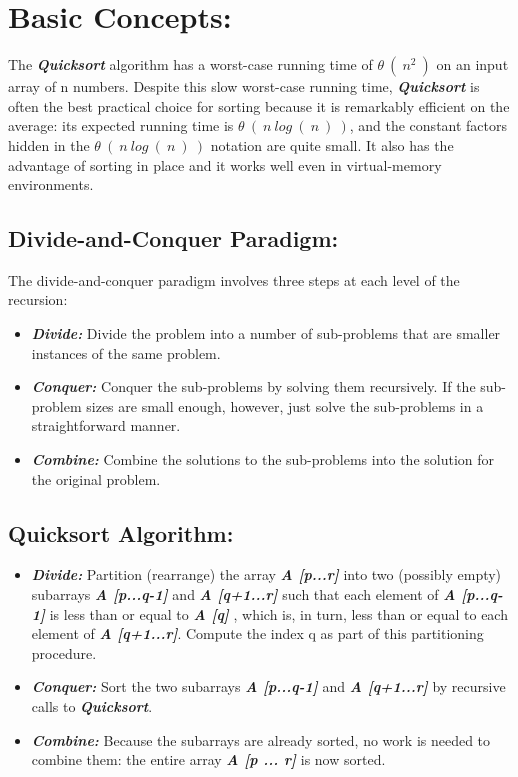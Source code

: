 \section{Basic Concepts:}

The {\bfseries\itshape Quicksort} algorithm has a worst-case running time of $\theta\ (\ n^{2}\ )$ on an input array of n numbers. Despite this slow worst-case running time, {\bfseries\itshape Quicksort} is often the best practical choice for sorting because it is remarkably efficient on the average: its expected running time is $\theta\ (\ n\ log\ (\ n\ )\ )$, and the constant factors hidden in the $\theta\ (\ n\ log\ (\ n\ )\ )$ notation are quite small. It also has the advantage of sorting in place and it works well even in virtual-memory environments.

\subsection{Divide-and-Conquer Paradigm:}

The divide-and-conquer paradigm involves three steps at each level of the recursion:

\begin{itemize}
\item {\bfseries\itshape Divide:} Divide the problem into a number of sub-problems that are smaller instances of the same problem.
\item {\bfseries\itshape Conquer:} Conquer the sub-problems by solving them recursively. If the sub-problem sizes are small enough, however, just solve the sub-problems in a straightforward manner.
\item {\bfseries\itshape Combine:} Combine the solutions to the sub-problems into the solution for the original problem.
\end{itemize}

\subsection{Quicksort Algorithm:}

\begin{itemize}
\item {\bfseries\itshape Divide:} Partition (rearrange) the array {\bfseries\itshape A [p...r]} into two (possibly empty) subarrays {\bfseries\itshape A [p...q-1]} and {\bfseries\itshape A [q+1...r]} such that each element of {\bfseries\itshape A [p...q-1]} is less than or equal to {\bfseries\itshape A [q]} , which is, in turn, less than or equal to each element of {\bfseries\itshape A [q+1...r]}. Compute the index q as part of this partitioning procedure.
\item {\bfseries\itshape Conquer:} Sort the two subarrays {\bfseries\itshape A [p...q-1]} and {\bfseries\itshape A [q+1...r]} by recursive calls to {\bfseries\itshape Quicksort}.
\item {\bfseries\itshape Combine:} Because the subarrays are already sorted, no work is needed to combine them: the entire array {\bfseries\itshape A [p ... r]} is now sorted.
\end{itemize}

\pagebreak